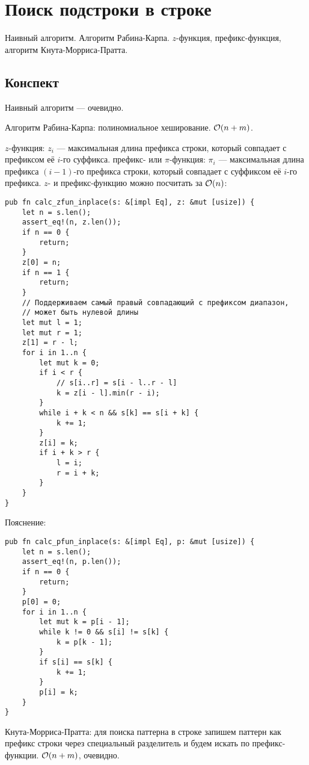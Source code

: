 \section{Поиск подстроки в строке}
Наивный алгоритм.
Алгоритм Рабина-Карпа.
$z$-функция, префикс-функция,
алгоритм Кнута-Морриса-Пратта.

\subsection{Конспект}
Наивный алгоритм --- очевидно.

Алгоритм Рабина-Карпа: полиномиальное хеширование.
$\O(n + m)$.

$z$-функция:
$z_i$ --- максимальная длина префикса строки,
который совпадает с префиксом её $i$-го суффикса.
префикс- или $\pi$-функция:
$\pi_i$ --- максимальная длина префикса $(i - 1)$-го префикса строки,
который совпадает с суффиксом её $i$-го префикса.
$z$- и префикс-функцию можно посчитать за $\O(n)$:

\bigskip
\noindent
\begin{minipage}{\textwidth}
\begin{verbatim}
pub fn calc_zfun_inplace(s: &[impl Eq], z: &mut [usize]) {
    let n = s.len();
    assert_eq!(n, z.len());
    if n == 0 {
        return;
    }
    z[0] = n;
    if n == 1 {
        return;
    }
    // Поддерживаем самый правый совпадающий с префиксом диапазон,
    // может быть нулевой длины
    let mut l = 1;
    let mut r = 1;
    z[1] = r - l;
    for i in 1..n {
        let mut k = 0;
        if i < r {
            // s[i..r] = s[i - l..r - l]
            k = z[i - l].min(r - i);
        }
        while i + k < n && s[k] == s[i + k] {
            k += 1;
        }
        z[i] = k;
        if i + k > r {
            l = i;
            r = i + k;
        }
    }
}
\end{verbatim}
\end{minipage}

Пояснение:
\begin{center}
    \begin{tikzpicture}

    \end{tikzpicture}
\end{center}

\bigskip
\noindent
\begin{minipage}{\textwidth}
\begin{verbatim}
pub fn calc_pfun_inplace(s: &[impl Eq], p: &mut [usize]) {
    let n = s.len();
    assert_eq!(n, p.len());
    if n == 0 {
        return;
    }
    p[0] = 0;
    for i in 1..n {
        let mut k = p[i - 1];
        while k != 0 && s[i] != s[k] {
            k = p[k - 1];
        }
        if s[i] == s[k] {
            k += 1;
        }
        p[i] = k;
    }
}
\end{verbatim}
\end{minipage}

Кнута-Морриса-Пратта:
для поиска паттерна в строке
запишем паттерн как префикс строки
через специальный разделитель
и будем искать по префикс-функции.
$\O(n + m)$, очевидно.
